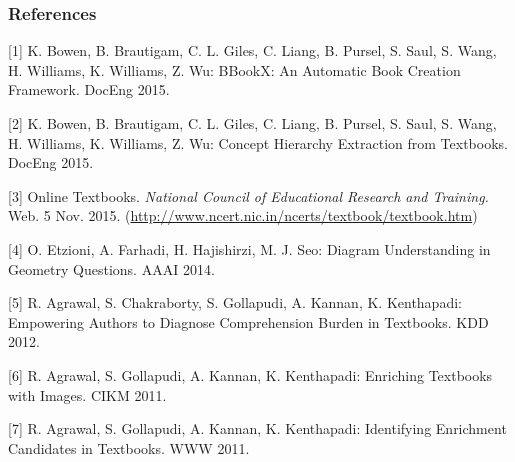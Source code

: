 \documentclass{article} %
\begin{document}
\subsubsection*{References}

[1] K. Bowen, B. Brautigam, C. L. Giles, C. Liang, B. Pursel, S. Saul, S. Wang, H. Williams, K. Williams, Z. Wu: BBookX: An Automatic Book Creation Framework. DocEng 2015.

[2] K. Bowen, B. Brautigam, C. L. Giles, C. Liang, B. Pursel, S. Saul, S. Wang, H. Williams, K. Williams, Z. Wu: Concept Hierarchy Extraction from Textbooks. DocEng 2015.

[3] Online Textbooks. {\it National Council of Educational Research and Training.} Web. 5 Nov. 2015. (\url{http://www.ncert.nic.in/ncerts/textbook/textbook.htm})

[4] O. Etzioni, A. Farhadi, H. Hajishirzi, M. J. Seo: Diagram Understanding in Geometry Questions. AAAI 2014.

[5] R. Agrawal, S. Chakraborty, S. Gollapudi, A. Kannan, K. Kenthapadi: Empowering Authors to Diagnose Comprehension Burden in Textbooks. KDD 2012.

[6] R. Agrawal, S. Gollapudi, A. Kannan, K. Kenthapadi: Enriching Textbooks with Images. CIKM 2011. 

[7] R. Agrawal, S. Gollapudi, A. Kannan, K. Kenthapadi: Identifying Enrichment Candidates in Textbooks. WWW 2011.
\end{document}

